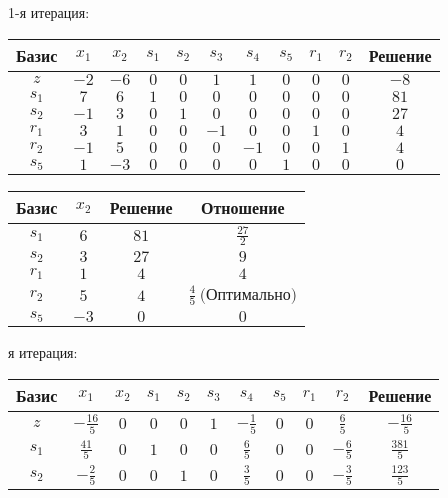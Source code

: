 \documentclass{article}%
\begin{document}
\begin{flushleft}%
1{-}я итерация: %
\newline%
\newline%
\renewcommand{\arraystretch}{1.3}%
\begin{tabular}{|c|ccccccccc|c|}%
\hline%
Базис&$x_{1}$&$x_{2}$&$s_{1}$&$s_{2}$&$s_{3}$&$s_{4}$&$s_{5}$&$r_{1}$&$r_{2}$&Решение\\%
\hline%
$z$&$-2$&$-6$&$0$&$0$&$1$&$1$&$0$&$0$&$0$&$-8$\\%
\hline%
$s_{1}$&$7$&$6$&$1$&$0$&$0$&$0$&$0$&$0$&$0$&$81$\\%
$s_{2}$&$-1$&$3$&$0$&$1$&$0$&$0$&$0$&$0$&$0$&$27$\\%
$r_{1}$&$3$&$1$&$0$&$0$&$-1$&$0$&$0$&$1$&$0$&$4$\\%
$r_{2}$&$-1$&$5$&$0$&$0$&$0$&$-1$&$0$&$0$&$1$&$4$\\%
$s_{5}$&$1$&$-3$&$0$&$0$&$0$&$0$&$1$&$0$&$0$&$0$\\%
\hline%
\end{tabular}%
\newline%
\newline%
\newline%
\begin{tabular}{|cccc|}%
\hline%
Базис&$x_{2}$&Решение&Отношение\\%
\hline%
$s_{1}$&$6$&$81$&$\frac{27}{2}$\\%
$s_{2}$&$3$&$27$&$9$\\%
$r_{1}$&$1$&$4$&$4$\\%
$r_{2}$&$5$&$4$&$\frac{4}{5}\: \text{(Оптимально)}$\\%
$s_{5}$&$-3$&$0$&$0$\\%
\hline%
\end{tabular}%
\newline%
\newline%
я итерация: %
\newline%
\newline%
\renewcommand{\arraystretch}{1.3}%
\begin{tabular}{|c|ccccccccc|c|}%
\hline%
Базис&$x_{1}$&$x_{2}$&$s_{1}$&$s_{2}$&$s_{3}$&$s_{4}$&$s_{5}$&$r_{1}$&$r_{2}$&Решение\\%
\hline%
$z$&$-\frac{16}{5}$&$0$&$0$&$0$&$1$&$-\frac{1}{5}$&$0$&$0$&$\frac{6}{5}$&$-\frac{16}{5}$\\%
\hline%
$s_{1}$&$\frac{41}{5}$&$0$&$1$&$0$&$0$&$\frac{6}{5}$&$0$&$0$&$-\frac{6}{5}$&$\frac{381}{5}$\\%
$s_{2}$&$-\frac{2}{5}$&$0$&$0$&$1$&$0$&$\frac{3}{5}$&$0$&$0$&$-\frac{3}{5}$&$\frac{123}{5}$\\%

\end{tabular}
\end{flushleft}
\end{document}
